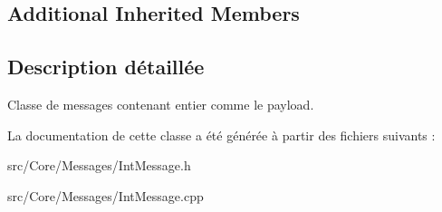 \subsection*{Additional Inherited Members}


\subsection{Description détaillée}
Classe de messages contenant entier comme le payload. 

La documentation de cette classe a été générée à partir des fichiers suivants \-:\begin{DoxyCompactItemize}
\item 
src/\-Core/\-Messages/Int\-Message.\-h\item 
src/\-Core/\-Messages/Int\-Message.\-cpp\end{DoxyCompactItemize}
